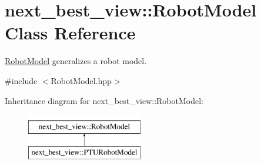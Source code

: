 \hypertarget{classnext__best__view_1_1RobotModel}{\section{next\-\_\-best\-\_\-view\-:\-:\-Robot\-Model \-Class \-Reference}
\label{classnext__best__view_1_1RobotModel}
}


\hyperlink{classnext__best__view_1_1RobotModel}{\-Robot\-Model} generalizes a robot model.  




{\ttfamily \#include $<$\-Robot\-Model.\-hpp$>$}

\-Inheritance diagram for next\-\_\-best\-\_\-view\-:\-:\-Robot\-Model\-:\begin{figure}[H]
\begin{center}
\leavevmode
\includegraphics[height=2.000000cm]{classnext__best__view_1_1RobotModel}
\end{center}
\end{figure}
